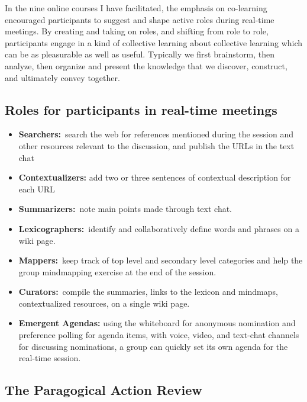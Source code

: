 In the nine online courses I have facilitated, the emphasis on
co-learning encouraged participants to suggest and shape active roles
during real-time meetings. By creating and taking on roles, and shifting
from role to role, participants engage in a kind of collective learning
about collective learning which can be as pleasurable as well as useful.
Typically we first brainstorm, then analyze, then organize and present
the knowledge that we discover, construct, and ultimately convey
together.

\subsection{Roles for participants in real-time
meetings}\label{roles-for-participants-in-real-time-meetings}

\begin{itemize}
\itemsep1pt\parskip0pt
\item
  \textbf{Searchers:}~search the web for references mentioned during the
  session and other resources relevant to the discussion, and publish
  the URLs in the text chat
\item
  \textbf{Contextualizers:} add two or three sentences of contextual
  description for each URL
\item
  \textbf{Summarizers:}~note main points made through text chat.
\item
  \textbf{Lexicographers:}~identify and collaboratively define words and
  phrases on a wiki page.
\item
  \textbf{Mappers:}~keep track of top level and secondary level
  categories and help the group mindmapping exercise at the end of the
  session.
\item
  \textbf{Curators:}~compile the summaries, links to the lexicon and
  mindmaps, contextualized resources, on a single wiki page.
\item
  \textbf{Emergent Agendas:} using the whiteboard for anonymous
  nomination and preference polling for agenda items, with voice, video,
  and text-chat channels for discussing nominations, a group can quickly
  set its own agenda for the real-time session.
\end{itemize}

\subsection{The Paragogical Action
Review}\label{the-paragogical-action-review}

